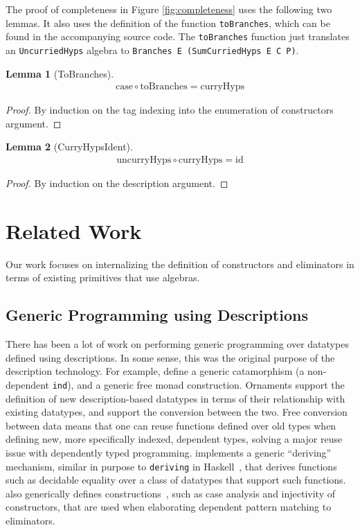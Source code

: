 \documentclass[nonatbib]{sigplanconf}
\newtheorem*{mylem}{Lemma}
\newcommand{\reffig}[1]{Figure \ref{fig:#1}}
\begin{document}
The proof of completeness in \reffig{completeness} uses the following
two lemmas. It also uses the definition of the function
{\tt toBranches}, which can be found in the accompanying source
code. The {\tt toBranches} function just translates an
{\tt UncurriedHyps} algebra to {\tt Branches E (SumCurriedHyps E C P)}.

\begin{mylem}[ToBranches]
\begin{align*}
\textrm{case} \circ \textrm{toBranches} = \textrm{curryHyps}
\end{align*}
\end{mylem}

\begin{proof}
By induction on the tag indexing into the enumeration of constructors argument.
\end{proof}

\begin{mylem}[CurryHypsIdent]
\begin{align*}
\textrm{uncurryHyps} \circ \textrm{curryHyps} = \textrm{id}
\end{align*}
\end{mylem}

\begin{proof}
By induction on the description argument.
\end{proof}



\section{Related Work}
\label{sec:related-work}

Our work focuses on internalizing the definition of constructors and
eliminators in terms of existing primitives that use algebras. 

\subsection{Generic Programming using Descriptions}

There has been a lot of work on performing generic programming over
datatypes defined using descriptions. In some sense, this was the original
purpose of the description technology. For example,
\citet{Chapman:2010:GAL:1932681.1863547} define a generic catamorphism
(a non-dependent {\tt ind}), and a generic free monad construction.
Ornaments \citep{mcbride2010ornamental} support the definition of new
description-based datatypes in terms of their relationship with
existing datatypes, and support the conversion between the two. Free
conversion between data means that one can reuse functions defined
over old types when defining new, more specifically indexed, dependent
types, solving a major reuse issue with dependently typed programming.
\citet{dagand:phd} implements a generic ``deriving'' mechanism,
similar in purpose to {\tt deriving} in
{\sc Haskell}~\citep{jones2003haskell}, that derives
functions such as decidable equality over a class of datatypes that
support such functions. \citet{dagand:phd} also generically defines
constructions~\citep{mcbride2006few}, such as case
analysis and injectivity of constructors, that are used when
elaborating dependent pattern matching to eliminators. 
\end{document}
